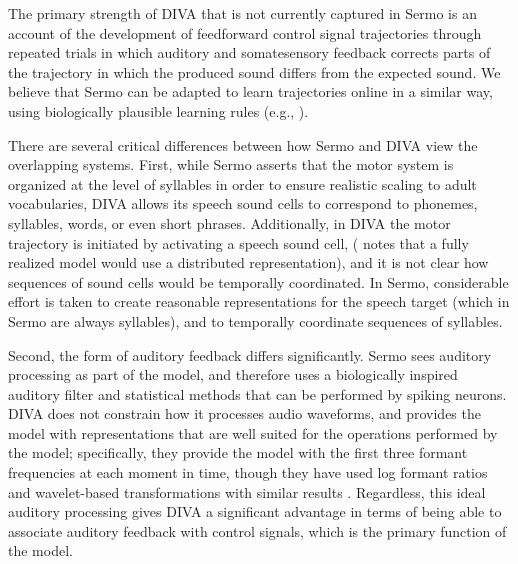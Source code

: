 The primary strength of DIVA
that is not currently captured in Sermo
is an account of the development
of feedforward control signal trajectories
through repeated trials in which
auditory and somatesensory feedback
corrects parts of the trajectory
in which the produced sound differs
from the expected sound.
We believe that Sermo can be adapted
to learn trajectories online in a similar way,
using biologically plausible learning rules
(e.g., \citealt{macneil2011,bekolay2013a}).

There are several critical differences
between how Sermo and DIVA view
the overlapping systems.
First, while Sermo asserts that
the motor system is organized at the level
of syllables in order to ensure
realistic scaling to adult vocabularies,
DIVA allows its speech sound cells to
correspond to phonemes, syllables, words,
or even short phrases.
Additionally, in DIVA
the motor trajectory is initiated
by activating a speech sound cell,
(\citealt{guenther2006a} notes that a fully realized
model would use a distributed representation),
and it is not clear how sequences
of sound cells would be temporally coordinated.
In Sermo, considerable effort is taken
to create reasonable representations
for the speech target
(which in Sermo are always syllables),
and to temporally coordinate
sequences of syllables.

Second, the form of auditory feedback
differs significantly.
Sermo sees auditory processing as part of
the model, and therefore uses
a biologically inspired auditory filter
and statistical methods that can be
performed by spiking neurons.
DIVA does not constrain
how it processes audio waveforms,
and provides the model with
representations that are well suited
for the operations performed by the model;
specifically, they provide the model with
the first three formant frequencies
at each moment in time,
though they have used log formant ratios
and wavelet-based transformations
with similar results \citep{guenther2006a}.
Regardless, this ideal auditory processing
gives DIVA a significant advantage
in terms of being able to
associate auditory feedback
with control signals,
which is the primary function of the model.

